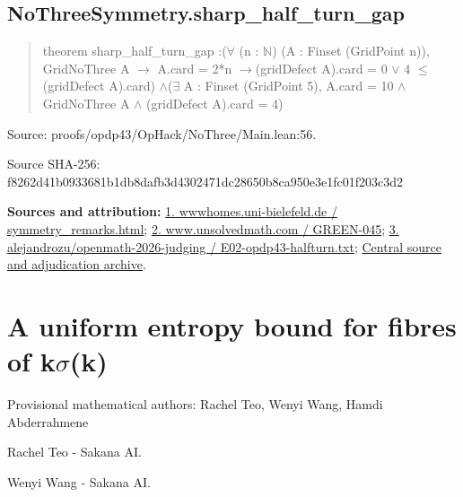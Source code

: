 \documentclass[11pt,a4paper]{article}
\begin{document}
\begin{samepage}
\subsection{NoThreeSymmetry.sharp\_half\_turn\_gap}
\begin{quote}\small\ttfamily theorem sharp\_half\_turn\_gap :\newline     (\ensuremath{\forall} (n : \ensuremath{\mathbb{N}}) (A : Finset (GridPoint n)), GridNoThree A \ensuremath{\to} A.card = 2*n \ensuremath{\to}\newline       (gridDefect A).card = 0 \ensuremath{\vee} 4 \ensuremath{\leq} (gridDefect A).card) \ensuremath{\wedge}\newline     (\ensuremath{\exists} A : Finset (GridPoint 5), A.card = 10 \ensuremath{\wedge} GridNoThree A \ensuremath{\wedge} (gridDefect A).card = 4)\end{quote}
{\small Source: proofs/opdp43/OpHack/NoThree/Main.lean:56.\par}

{\small Source SHA-256: f8262d41b0933681b1db8dafb3d4302471dc28650b8ca950e3e1fc01f203c3d2\par}

{\small\textbf{Sources and attribution:} \href{https://wwwhomes.uni-bielefeld.de/achim/no3in/symmetry_remarks.html}{1. wwwhomes.uni-bielefeld.de / symmetry\_remarks.html}; \href{https://www.unsolvedmath.com/problems/GREEN-045}{2. www.unsolvedmath.com / GREEN-045}; \href{https://github.com/alejandrozu/openmath-2026-judging/blob/d0ed487f487fa7ec814ff705ab55249983fe8707/OpenMath-Judging/review/entries/E02-opdp43-halfturn.txt}{3. alejandrozu/openmath-2026-judging / E02-opdp43-halfturn.txt}; \href{https://github.com/alejandrozu/openmath-2026-judging}{Central source and adjudication archive}.\par}

\end{samepage}
\clearpage
\section{A uniform entropy bound for fibres of k\ensuremath{\sigma}(k)}
{\small Provisional mathematical authors: Rachel Teo, Wenyi Wang, Hamdi Abderrahmene\par}\medskip
{\small Rachel Teo  -  Sakana AI.\par}

{\small Wenyi Wang  -  Sakana AI.\par}
\end{document}

